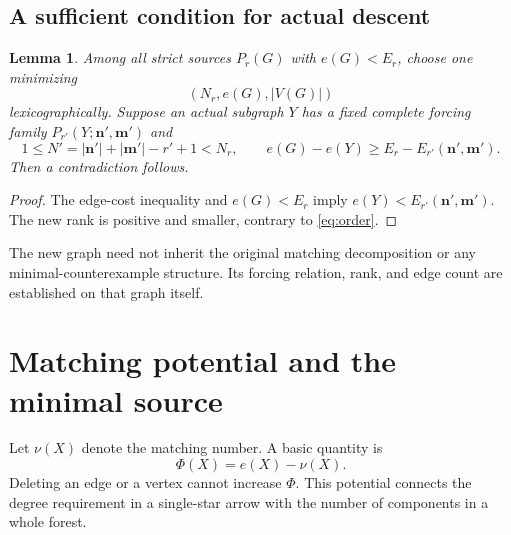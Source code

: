 \documentclass[11pt,a4paper]{article}
\newcommand{\nn}{\mathbf n}\newcommand{\mm}{\mathbf m}
\newtheorem{lemma}[theorem]{Lemma}
\theoremstyle{definition}
\begin{document}
\subsection{A sufficient condition for actual descent}
\begin{lemma}\label{lem:descent}
Among all strict sources $P_r(G)$ with $e(G)<E_r$, choose one minimizing
\begin{equation}\label{eq:order}
(N_r,e(G),|V(G)|)
\end{equation}
lexicographically. Suppose an actual subgraph $Y$ has a fixed complete forcing family $P_{r'}(Y;\nn',\mm')$ and
\[
1\le N'=|\nn'|+|\mm'|-r'+1<N_r,\qquad
e(G)-e(Y)\ge E_r-E_{r'}(\nn',\mm').
\]
Then a contradiction follows.
\end{lemma}
\begin{proof}
The edge-cost inequality and $e(G)<E_r$ imply
$e(Y)<E_{r'}(\nn',\mm')$. The new rank is positive and smaller, contrary to \eqref{eq:order}.
\end{proof}
The new graph need not inherit the original matching decomposition or any minimal-counterexample structure. Its forcing relation, rank, and edge count are established on that graph itself.


\section{Matching potential and the minimal source}\label{sec:potential}
Let $\nu(X)$ denote the matching number. A basic quantity is
\[
\Phi(X)=e(X)-\nu(X).
\]
Deleting an edge or a vertex cannot increase $\Phi$. This potential connects the degree requirement in a single-star arrow with the number of components in a whole forest.
\end{document}
